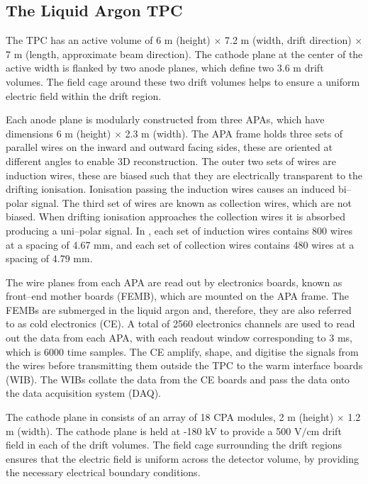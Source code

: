 \subsection{The Liquid Argon TPC}

The \protodune{} TPC has an active volume of 6 m (height) $\times$ 7.2 m (width,
drift direction) $\times$ 7 m (length, approximate beam direction). The cathode 
plane at the center of the active width is flanked by two anode planes, which 
define two 3.6 m drift volumes. The field cage around these two drift volumes
helps to ensure a uniform electric field within the drift region.

Each anode plane is modularly constructed from three APAs, which have dimensions
6 m (height) $\times$ 2.3 m (width). The APA frame holds three sets of parallel
wires on the inward and outward facing sides, these are oriented at different 
angles to enable 3D reconstruction. The outer two sets of wires are induction
wires, these are biased such that they are electrically transparent to the 
drifting ionisation. Ionisation passing the induction wires causes an induced 
bi--polar signal. The third set of wires are known as collection wires, which
are not biased. When drifting ionisation approaches the collection wires 
it is absorbed producing a uni--polar signal. In \protodune{}, each set of 
induction wires contains 800 wires at a spacing of 4.67 mm, and each set of 
collection wires contains 480 wires at a spacing of 4.79 mm. 

The wire planes from each APA are read out by electronics boards, known as
front--end mother boards (FEMB), which are mounted on the APA frame. The FEMBs 
are submerged in the liquid argon and, therefore, they are also referred to as 
cold electronics (CE). A total of 2560 electronics channels are used to read 
out the data from each APA, with each readout window corresponding to 3 ms, 
which is 6000 time samples. The CE amplify, shape, and digitise the signals 
from the wires before transmitting them outside the TPC to the warm interface 
boards (WIB). The WIBs collate the data from the CE boards and pass the data 
onto the data acquisition system (DAQ).

The cathode plane in \protodune{} consists of an array of 18 CPA modules, 2 m 
(height) $\times$ 1.2 m (width). The cathode plane is held at -180 kV to 
provide a 500 $\mbox{V/cm}$ drift field in each of the drift volumes. The 
field cage surrounding the drift regions ensures that the electric field is 
uniform across the detector volume, by providing the necessary electrical
boundary conditions.

